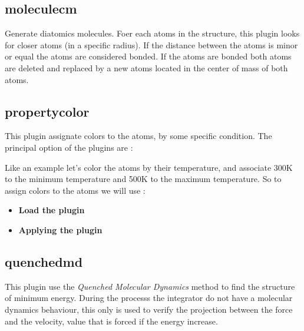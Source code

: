 \subsection{moleculecm}
Generate diatomics molecules. Foer each atoms in the structure, this plugin
looks for closer atoms (in a specific radius). If the distance between the
atoms is minor or equal the atoms are considered bonded. If the atoms are
bonded both atoms are deleted and replaced by a new atoms located in the center
of mass of both atoms.



\subsection{propertycolor}
This plugin assignate colors to the atoms, by some specific condition. The
principal option of the plugins are :


Like an example let's color the atoms by their temperature, and associate 300K
to the minimum temperature and 500K to the maximum temperature. So to assign
colors to the atoms we will use :

\begin{itemize}
 \item \textbf{Load the plugin}
 \item \textbf{Applying the plugin}
\end{itemize}

\subsection{quenchedmd}
This plugin use the \textit{Quenched Molecular Dynamics} method to find the
structure of minimum energy. During the processs the integrator do not
have a molecular dynamics behaviour, this only is used to verify the
projection between the force and the velocity, value that is forced if
the energy increase. 

